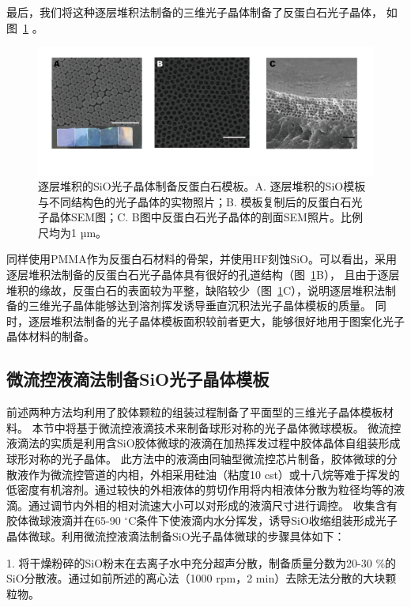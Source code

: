 最后，我们将这种逐层堆积法制备的三维光子晶体制备了反蛋白石光子晶体，
如图~\ref{fig:mono-inverse}
。
\begin{figure}[htbp]
  \centering
  \includegraphics[width=\linewidth]{figures/ch2/mono-inverse.png}
  \caption{逐层堆积的SiO光子晶体制备反蛋白石模板。A. 逐层堆积的SiO模板与不同结构色的光子晶体的实物照片；B. 模板复制后的反蛋白石光子晶体SEM图；C. B图中反蛋白石光子晶体的剖面SEM照片。比例尺均为1 µm。}
  \label{fig:mono-inverse}
\end{figure}
同样使用PMMA作为反蛋白石材料的骨架，并使用HF刻蚀SiO。可以看出，采用逐层堆积法制备的反蛋白石光子晶体具有很好的孔道结构（图~\ref{fig:mono-inverse}B），
且由于逐层堆积的缘故，反蛋白石的表面较为平整，缺陷较少（图~\ref{fig:mono-inverse}C），说明逐层堆积法制备的三维光子晶体能够达到溶剂挥发诱导垂直沉积法光子晶体模板的质量。
同时，逐层堆积法制备的光子晶体模板面积较前者更大，能够很好地用于图案化光子晶体材料的制备。

\subsection{微流控液滴法制备SiO光子晶体模板}
\label{subsec:microfluid-opal}

前述两种方法均利用了胶体颗粒的组装过程制备了平面型的三维光子晶体模板材料。
本节中将基于微流控液滴技术来制备球形对称的光子晶体微球模板。
微流控液滴法的实质是利用含SiO胶体微球的液滴在加热挥发过程中胶体晶体自组装形成球形对称的光子晶体。
此方法中的液滴由同轴型微流控芯片制备，胶体微球的分散液作为微流控管道的内相，外相采用硅油（粘度10 cst）或十八烷等难于挥发的低密度有机溶剂。通过较快的外相液体的剪切作用将内相液体分散为粒径均等的液滴。通过调节内外相的相对流速大小可以对形成的液滴尺寸进行调控。
收集含有胶体微球液滴并在65-90 $^{\circ}$C条件下使液滴内水分挥发，诱导SiO收缩组装形成光子晶体微球。利用微流控液滴法制备SiO光子晶体微球的步骤具体如下：

1. 将干燥粉碎的SiO粉末在去离子水中充分超声分散，制备质量分数为20-30 \%的SiO分散液。通过如前所述的离心法（1000 rpm，2 min）去除无法分散的大块颗粒物。

